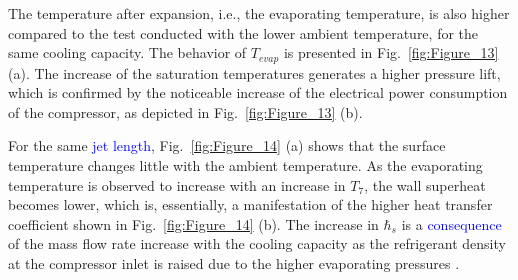 \documentclass[review,preprint,12pt]{elsarticle}
\begin{document}
%

The temperature after expansion, i.e., the evaporating temperature, is also higher compared to the test conducted with the lower ambient temperature, for the same cooling capacity. The behavior of $T_{evap}$ is presented in Fig.~\ref{fig:Figure_13} (a). The increase of the saturation temperatures generates a higher pressure lift, which is confirmed by the noticeable increase of the electrical power consumption of the compressor, as depicted in Fig.~\ref{fig:Figure_13} (b).

For the same \textcolor{blue}{jet length}, Fig.~\ref{fig:Figure_14} (a) shows that the surface temperature changes little with the ambient temperature. As the evaporating temperature is observed to increase with an increase in $T_{7}$, the wall superheat becomes lower, which is, essentially, a manifestation of the higher heat transfer coefficient shown in Fig.~\ref{fig:Figure_14} (b). The increase in $\hbar_{s}$ is a  \textcolor{blue}{consequence} of the mass flow rate increase with the cooling capacity as the refrigerant density at the compressor inlet is raised due to the higher evaporating pressures \cite{OliveiraBarbosaJr.2016}.
\end{document}
